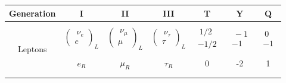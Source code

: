 \begin{table}[]
\centering
\begin{tabular}{|cccc|c|c|c|}\hline
Generation               & I                   & II                  & III                 & T                       & Y                   & Q                   \\\hline

\multirow{6}{*}{Leptons}                          &                     &                     &                     &                         &                     &                     \\
& $\begin{pmatrix}\ \nu_e\\ e \end{pmatrix}_L$ & $\begin{pmatrix}\ \nu_\mu\\ \mu \end{pmatrix}_L$ & $\begin{pmatrix}\ \nu_\tau\\ \tau \end{pmatrix}_L$ & $\begin{matrix}\ 1/2\\ -1/2 \end{matrix}$ & $\begin{matrix}\ -1\\ -1 \end{matrix}$ & $\begin{matrix}\ 0\\ -1 \end{matrix}$ \\
                         &                     &                     &                     &                         &                     &                     \\
                         & $e_R$         & $\mu_R$      & $\tau_R$                  & 0                      & -2                  & 1    \\
                         &                     &                     &                     &                         &                     &                     \\\hline
\multirow{7}{*}{Quarks} 
                         &                     &                     &                     &                         &                     &                     \\

\end{tabular}
\end{table}
